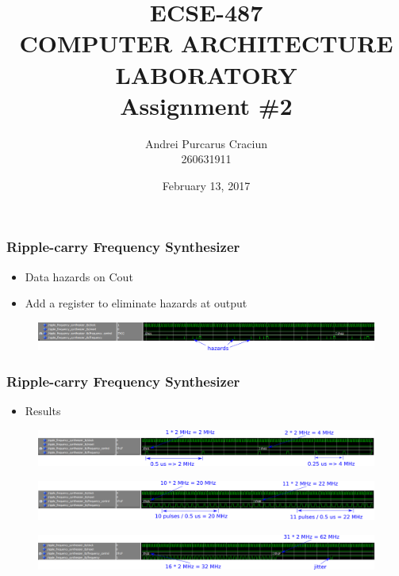 \documentclass{beamer}
\title{\textbf{ECSE-487 \\ COMPUTER ARCHITECTURE LABORATORY \\ Assignment \#2}}
\author{Andrei Purcarus Craciun \\ 260631911}
\date{February 13, 2017}
\begin{document}
\maketitle

\begin{frame}
\frametitle{Ripple-carry Frequency Synthesizer}

\begin{itemize}
    \item Data hazards on Cout
    \item Add a register to eliminate hazards at output
\end{itemize}

\begin{figure}[!htb]
    \centering
    \includegraphics[width=\linewidth]{cout_hazard.PNG}
\end{figure}

\end{frame}

\begin{frame}
\frametitle{Ripple-carry Frequency Synthesizer}

\begin{itemize}
    \item Results
\end{itemize}

\begin{figure}[!htb]
    \centering
    \includegraphics[width=\linewidth]{ripple_2_4_MHz.PNG}
\end{figure}
\begin{figure}[!htb]
    \centering
    \includegraphics[width=\linewidth]{ripple_20_22_MHz.PNG}
\end{figure}
\begin{figure}[!htb]
    \centering
    \includegraphics[width=\linewidth]{ripple_32_62_MHz.PNG}
\end{figure}

\end{frame}
\end{document}
